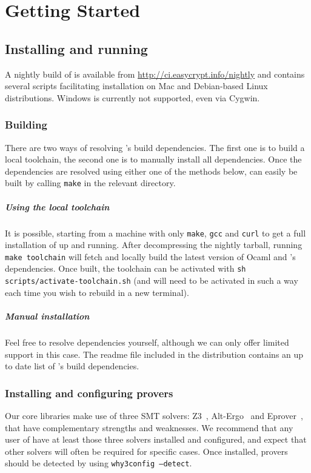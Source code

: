 
\chapter{Getting Started}
\section{Installing and running \EasyCrypt}
A nightly build of \EasyCrypt is available from \url{http://ci.easycrypt.info/nightly}
and contains several scripts facilitating installation on Mac and Debian-based
Linux distributions. Windows is currently not supported, even via Cygwin.

\subsection{Building \EasyCrypt}
There are two ways of resolving \EasyCrypt's build dependencies. The first one is to
build a local toolchain, the second one is to manually install all dependencies.
Once the dependencies are resolved using either one of the methods below,
\EasyCrypt can easily be built by calling \texttt{make} in the relevant directory.

\paragraph{Using the local toolchain}
It is possible, starting from a machine with only \texttt{make}, \texttt{gcc}
and \texttt{curl} to get a full installation of \EasyCrypt up and running. After
decompressing the nightly tarball, running \texttt{make toolchain} will fetch
and locally build the latest version of Ocaml and \EasyCrypt's dependencies. Once
built, the toolchain can be activated with \texttt{sh scripts/activate-toolchain.sh}
(and will need to be activated in such a way each time you wish to rebuild \EasyCrypt
in a new terminal).

\paragraph{Manual installation}
Feel free to resolve dependencies yourself, although we can only offer limited
support in this case. The readme file included in the distribution contains an
up to date list of \EasyCrypt's build dependencies.

\subsection{Installing and configuring provers}
Our core libraries make use of three SMT solvers: Z3~\cite{}, Alt-Ergo~\cite{}
and Eprover~\cite{}, that have complementary strengths and weaknesses. We
recommend that any user of \EasyCrypt have at least those three solvers installed and
configured, and expect that other solvers will often be required for specific
cases. Once installed, provers should be detected by \WhyThree using
\texttt{why3config --detect}.

